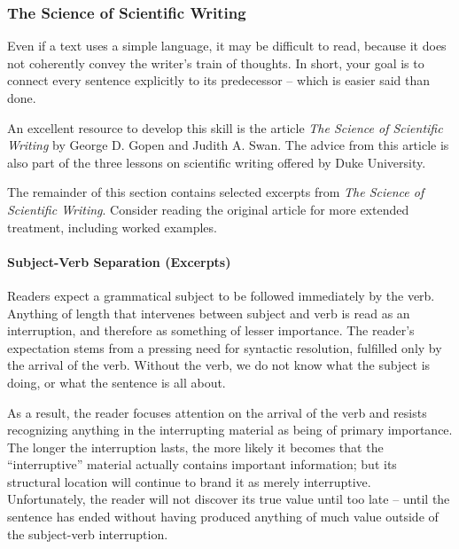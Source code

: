 \subsubsection{The Science of Scientific Writing}

Even if a text uses a simple language, it may be difficult to read, because it does not coherently convey the writer's train of thoughts. In short, your goal is to connect every sentence explicitly to its predecessor – which is easier said than done.

An excellent resource to develop this skill is the article \emph{The Science of Scientific Writing} by George D. Gopen and Judith A. Swan.
The advice from this article is also part of the three lessons on scientific writing offered by Duke University.

The remainder of this section contains selected excerpts from \emph{The Science of Scientific Writing}. Consider reading the original article for more extended treatment, including worked examples.

\paragraph{Subject-Verb Separation (Excerpts)}

  Readers expect a grammatical subject to be followed immediately by the verb. Anything of length that intervenes between subject and verb is read as an interruption, and therefore as something of lesser importance.
The reader’s expectation stems from a pressing need for syntactic resolution, fulfilled only by the arrival of the verb. Without the verb, we do not know what the subject is doing, or what the sentence is all about.

As a result, the reader focuses attention on the arrival of the verb and resists recognizing anything in the interrupting material as being of primary importance.
The longer the interruption lasts, the more likely it becomes that the “interruptive” material actually contains important information; but its structural location will continue to brand it as merely interruptive.
Unfortunately, the reader will not discover its true value until too late – until the sentence has ended without having produced anything of much value outside of the subject-verb interruption.

